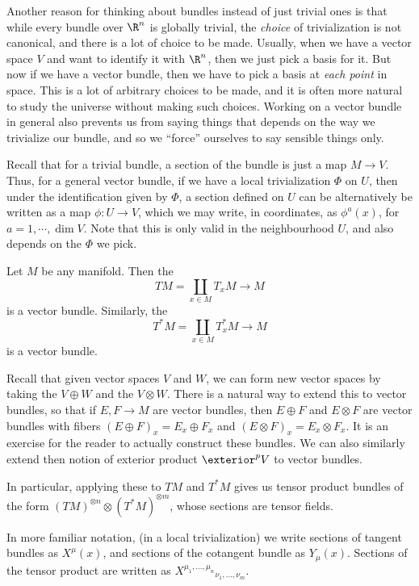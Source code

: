 \documentclass[a4paper]{article}
\begin{document}
Another reason for thinking about bundles instead of just trivial ones is that while every bundle over $\R^n$ is globally trivial, the \emph{choice} of trivialization is not canonical, and there is a lot of choice to be made. Usually, when we have a vector space $V$ and want to identify it with $\R^n$, then we just pick a basis for it. But now if we have a vector bundle, then we have to pick a basis at \emph{each point} in space. This is a lot of arbitrary choices to be made, and it is often more natural to study the universe without making such choices. Working on a vector bundle in general also prevents us from saying things that depends on the way we trivialize our bundle, and so we ``force'' ourselves to say sensible things only.

Recall that for a trivial bundle, a section of the bundle is just a map $M \to V$. Thus, for a general vector bundle, if we have a local trivialization $\Phi$ on $U$, then under the identification given by $\Phi$, a section defined on $U$ can be alternatively be written as a map $\phi: U \to V$, which we may write, in coordinates, as $\phi^a(x)$, for $a = 1, \cdots, \dim V$. Note that this is only valid in the neighbourhood $U$, and also depends on the $\Phi$ we pick.

\begin{eg}
  Let $M$ be any manifold. Then the 
  \[
    TM = \coprod_{x \in M} T_x M \to M
  \]
  is a vector bundle. Similarly, the 
  \[
    T^*M = \coprod_{x \in M} T_x^* M \to M
  \]
  is a vector bundle.

  Recall that given vector spaces $V$ and $W$, we can form new vector spaces by taking the  $V \oplus W$ and the  $V \otimes W$. There is a natural way to extend this to vector bundles, so that if $E, F \to M$ are vector bundles, then $E \oplus F$ and $E \otimes F$ are vector bundles with fibers $(E \oplus F)_x = E_x \oplus F_x$ and $(E \otimes F)_x = E_x \otimes F_x$. It is an exercise for the reader to actually construct these bundles. We can also similarly extend then notion of exterior product $\exterior^p V$ to vector bundles.

  In particular, applying these to $TM$ and $T^*M$ gives us tensor product bundles of the form $(TM)^{\otimes n} \otimes (T^*M)^{\otimes m}$, whose sections are tensor fields.

  In more familiar notation, (in a local trivialization) we write sections of tangent bundles as $X^\mu(x)$, and sections of the cotangent bundle as $Y_\mu(x)$. Sections of the tensor product are written as $X^{\mu_1, \ldots, \mu_n}\!_{\nu_1, \ldots, \nu_m}$.
\end{eg}
\end{document}
